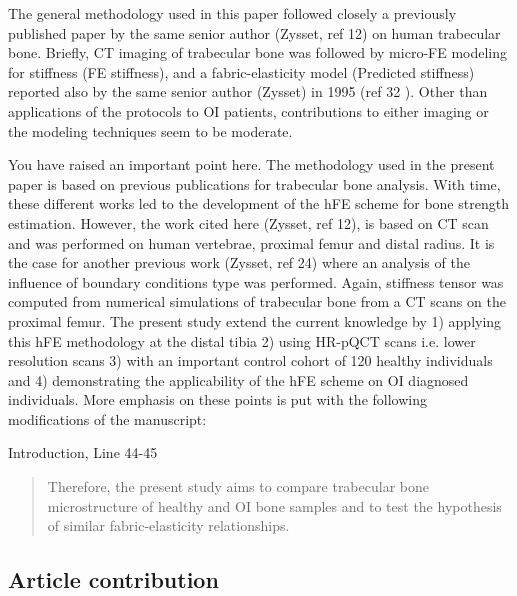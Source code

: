 \documentclass{AR2RC}
\begin{document}
\RC The general methodology used in this paper followed closely a previously published paper by the same senior author (Zysset, ref 12) on human trabecular bone. Briefly, CT imaging of trabecular bone was followed by micro-FE modeling for stiffness (FE stiffness), and a fabric-elasticity model (Predicted stiffness) reported also by the same senior author (Zysset) in 1995 (ref 32 ). Other than applications of the protocols to OI patients, contributions to either imaging or the modeling techniques seem to be moderate.

\AR You have raised an important point here. The methodology used in the present paper is based on previous publications for trabecular bone analysis. With time, these different works led to the development of the hFE scheme for bone strength estimation. However, the work cited here (Zysset, ref 12), is based on \si{\micro}CT scan and was performed on human vertebrae, proximal femur and distal radius. It is the case for another previous work (Zysset, ref 24) where an analysis of the influence of boundary conditions type was performed. Again, stiffness tensor was computed from numerical simulations of trabecular bone from a \si{\micro}CT scans on the proximal femur. The present study extend the current knowledge by 1) applying this hFE methodology at the distal tibia 2) using HR-pQCT scans i.e. lower resolution scans 3) with an important control cohort of 120 healthy individuals and 4) demonstrating the applicability of the hFE scheme on OI diagnosed individuals. More emphasis on these points is put with the following modifications of the manuscript:\par

Introduction, Line 44-45
\begin{quote}
	Therefore, the present study aims to compare trabecular bone microstructure of healthy and OI bone samples and to test the hypothesis of similar fabric-elasticity relationships.
\end{quote}

\subsection{Article contribution}
\end{document}
